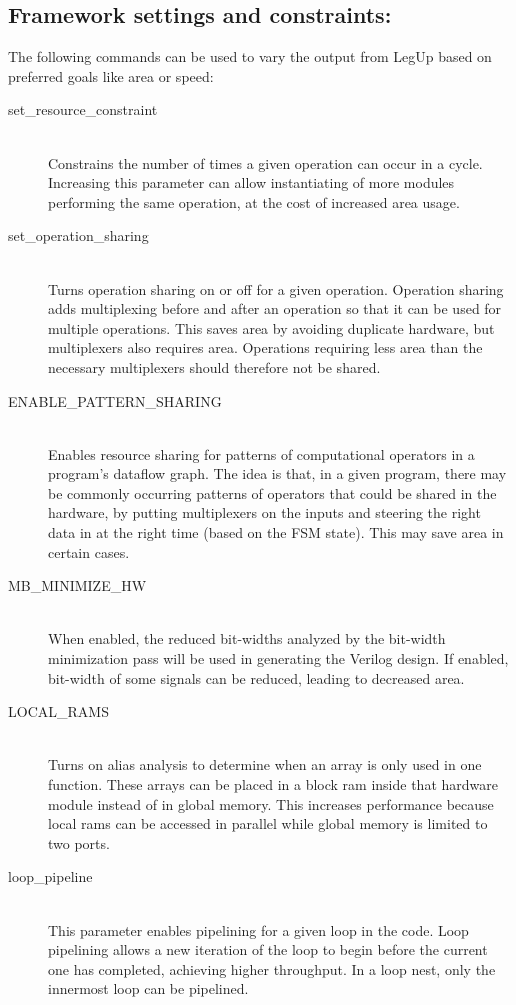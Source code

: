 \subsection{Framework settings and constraints:}
The following commands can be used to vary the output from LegUp based on preferred goals like area or speed:
\begin{description}
  \item[set\_resource\_constraint] \hfill \\
      Constrains the number of times a given operation can occur in a cycle. Increasing this parameter can allow instantiating of more modules performing the same operation, at the cost of increased area usage. 
  \item[set\_operation\_sharing] \hfill \\
      Turns operation sharing on or off for a given operation. Operation sharing adds multiplexing before and after an operation so that it can be used for multiple operations. This saves area by avoiding duplicate hardware, but multiplexers also requires area. Operations requiring less area than the necessary multiplexers should therefore not be shared.
  \item[ENABLE\_PATTERN\_SHARING] \hfill \\
      Enables resource sharing for patterns of computational operators in a program’s dataflow graph. The idea is that, in a given program, there may be commonly occurring patterns of operators that could be shared in the hardware, by putting multiplexers on the inputs and steering the right data in at the right time (based on the FSM state). This may save area in certain cases. \cite{hadjis2012impact}
  \item[MB\_MINIMIZE\_HW] \hfill \\
      When enabled, the reduced bit-widths analyzed by the bit-width minimization pass will be used in generating the Verilog design. If enabled, bit-width of some signals can be reduced, leading to decreased area.
  \item[LOCAL\_RAMS] \hfill \\
      Turns on alias analysis to determine when an array is only used in one function. These arrays can be placed in a block ram inside that hardware module instead of in global memory. This increases performance because local rams can be accessed in parallel while global memory is limited to two ports.
  \item[loop\_pipeline] \hfill \\
     This parameter enables pipelining for a given loop in the code. Loop pipelining allows a new iteration of the loop to begin before the current one has completed, achieving higher throughput. In a loop nest, only the innermost loop can be pipelined.
\end{description}
